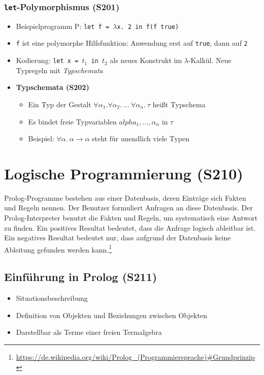 \subsubsection{\texttt{let}-Polymorphismus (S201)}
\begin{itemize}
	\item Beispielprogramm P: \texttt{let f = \(\lambda\)x. 2 in f(f true)}
	\item \texttt{f} ist eine polymorphe Hilfsfunktion: Anwendung erst auf \texttt{true}, dann auf \texttt{2}
	\item Kodierung: \texttt{let x = \(t_1\) in \(t_2\)} als neues Konstrukt im \(\lambda\)-Kalkül. Neue Typregeln mit \textit{Typschemata}
	\item \textbf{Typschemata (S202)}
	\begin{itemize}
		\item Ein Typ der Gestalt \(\forall\alpha_1.\forall\alpha_2.~...~\forall\alpha_n.~\tau\) heißt Typschema
		\item Es bindet freie Typvariablen \(alpha_1,...,\alpha_n\) in \(\tau\)
		\item Beispiel: \(\forall\alpha.~\alpha\rightarrow\alpha\) steht für unendlich viele Typen
	\end{itemize}
\end{itemize}


\section{Logische Programmierung (S210)}
Prolog-Programme bestehen aus einer Datenbasis, deren Einträge sich Fakten und Regeln nennen. Der Benutzer formuliert Anfragen an diese Datenbasis. Der Prolog-Interpreter benutzt die Fakten und Regeln, um systematisch eine Antwort zu finden. Ein positives Resultat bedeutet, dass die Anfrage logisch ableitbar ist. Ein negatives Resultat bedeutet nur, dass aufgrund der Datenbasis keine Ableitung gefunden werden kann.\footnote{\url{https://de.wikipedia.org/wiki/Prolog_(Programmiersprache)\#Grundprinzip}}

\subsection{Einführung in Prolog (S211)}
\begin{itemize}
	\item Situationsbeschreibung
	\item Definition von Objekten und Beziehungen zwischen Objekten
	\item Darstellbar als Terme einer freien Termalgebra
\end{itemize}


